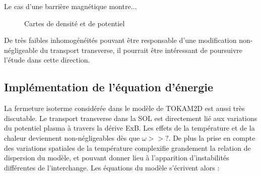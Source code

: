 \begin{refsection}
	Le cas d'une barrière magnétique montre...
	\begin{figure}
    \centering
    \caption{Cartes de densité  et de potentiel
    }
    \label{2-CartesMagBarrier}
\end{figure}

	
	De très faibles inhomogénéités pouvant être responsable d'une modification non-négligeable du transport transverse, il pourrait 
	être intéressant de poursuivre l'étude dans cette direction.
	
	\subsection{Implémentation de l'équation d'énergie}
	La fermeture isoterme considérée dans le modèle de TOKAM2D est aussi très
	discutable. Le transport transverse dans la SOL est directement lié aux
	variations du potentiel plasma à travers la dérive ExB.  Les effets de la température et de la chaleur deviennent
	non-négligeables dès que $\omega>>\text{?}$. De plus la prise en compte des
	variations spatiales de la température complexifie grandement la relation de
	dispersion du modèle, et pouvant donner lieu à l'apparition d'instabilités différentes de l'interchange.
	Les équations du modèle s'écrivent alors :
	

\end{refsection}
